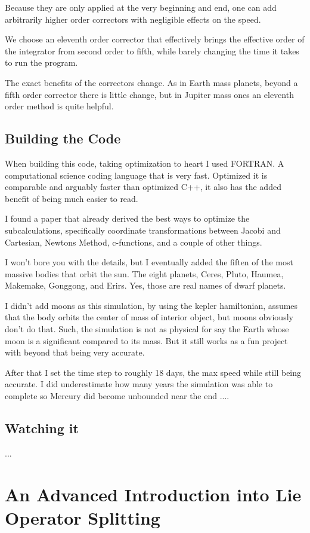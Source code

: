 Because they are only applied at the very beginning and end, one can add arbitrarily higher order correctors with negligible effects on the speed.

We choose an eleventh order corrector that effectively brings the effective order of the integrator from second order to fifth, while barely changing the time it takes to run the program.

The exact benefits of the correctors change. As in Earth mass planets, beyond a fifth order corrector there is little change, but in Jupiter mass ones an eleventh order method is quite helpful.


\subsection{Building the Code}

When building this code, taking optimization to heart I used FORTRAN. A computational science coding language that is very fast. Optimized it is comparable and arguably faster than optimized C++, it also has the added benefit of being much easier to read.

I found a paper that already derived the best ways to optimize the subcalculations, specifically coordinate transformations between Jacobi and Cartesian, Newtons Method, c-functions, and a couple of other things.

I won't bore you with the details, but I eventually added the fiften of the most massive bodies that orbit the sun. The eight planets, Ceres, Pluto, Haumea, Makemake, Gonggong, and Erirs. Yes, those are real names of dwarf planets.

I didn't add moons as this simulation, by using the kepler hamiltonian, assumes that the body orbits the center of mass of interior object, but moons obviously don't do that. Such, the simulation is not as physical for say the Earth whose moon is a significant compared to its mass. But it still works as a fun project with beyond that being very accurate.

After that I set the time step to roughly 18 days, the max speed while still being accurate. I did underestimate how many years the simulation was able to complete so Mercury did become unbounded near the end
....

\subsection{Watching it}
...


\section{An Advanced Introduction into Lie Operator Splitting}


